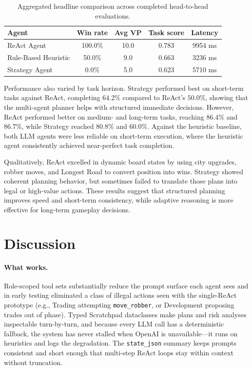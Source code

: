 \documentclass{article} %
\begin{document}
\begin{table}[h]
\caption{Aggregated headline comparison across completed head-to-head evaluations.}
\label{tab:results}
\begin{center}
\small
\begin{tabular}{@{}lcccc@{}}
\toprule
\textbf{Agent} & \textbf{Win rate} & \textbf{Avg VP} & \textbf{Task score} & \textbf{Latency} \\
\midrule
ReAct Agent       & 100.0\% & 10.0 & 0.783 & 9954 ms \\
Rule-Based Heuristic      & 50.0\%  & 9.0  & 0.663 & 3236 ms \\
Strategy Agent        & 0.0\%   & 5.0  & 0.623 & 5710 ms \\
\bottomrule
\end{tabular}
\end{center}
\end{table}

Performance also varied by task horizon. Strategy performed best on short-term tasks against ReAct, completing $64.2\%$ compared to ReAct's $50.0\%$, showing that the multi-agent planner helps with structured immediate decisions. However, ReAct performed better on medium- and long-term tasks, reaching $86.4\%$ and $86.7\%$, while Strategy reached $80.8\%$ and $60.0\%$. Against the heuristic baseline, both LLM agents were less reliable on short-term execution, where the heuristic agent consistently achieved near-perfect task completion.

Qualitatively, ReAct excelled in dynamic board states by using city upgrades, robber moves, and Longest Road to convert position into wins. Strategy showed coherent planning behavior, but sometimes failed to translate those plans into legal or high-value actions. These results suggest that structured planning improves speed and short-term consistency, while adaptive reasoning is more effective for long-term gameplay decisions.

\section{Discussion}
\label{sec:discussion}

\paragraph{What works.} Role-scoped tool sets substantially reduce the prompt surface each agent sees and in early testing eliminated a class of illegal actions seen with the single-ReAct prototype (e.g., Trading attempting \texttt{move\_robber}, or Development proposing trades out of phase). Typed Scratchpad dataclasses make plans and risk analyses inspectable turn-by-turn, and because every LLM call has a deterministic fallback, the system has never stalled when OpenAI is unavailable---it runs on heuristics and logs the degradation. The \texttt{state\_json} summary keeps prompts consistent and short enough that multi-step ReAct loops stay within context without truncation.
\end{document}
